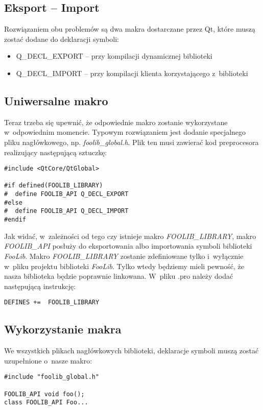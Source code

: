 \subsection{Eksport -- Import}
Rozwiązaniem obu problemów są dwa makra dostarczane przez Qt, które muszą zostać dodane do deklaracji symboli:
\begin{itemize}
\item{Q\_DECL\_EXPORT -- przy kompilacji dynamicznej biblioteki}
\item{Q\_DECL\_IMPORT -- przy kompilacji klienta korzystającego z~biblioteki}
\end{itemize}

\subsection{Uniwersalne makro}
Teraz trzeba się upewnić, że odpowiednie makro zostanie wykorzystane w~odpowiednim momencie. Typowym rozwiązaniem jest dodanie specjalnego pliku nagłówkowego, np. \textit{foolib\_global.h}. Plik ten musi zawierać kod preprocesora realizujący następującą sztuczkę:
\begin{verbatim}
#include <QtCore/QtGlobal>

#if defined(FOOLIB_LIBRARY)
#  define FOOLIB_API Q_DECL_EXPORT
#else
#  define FOOLIB_API Q_DECL_IMPORT
#endif
\end{verbatim}

Jak widać, w~zależności od tego czy istnieje makro \textit{FOOLIB\_LIBRARY}, makro \textit{FOOLIB\_API} posłuży do eksportowania albo importowania symboli biblioteki \textit{FooLib}. Makro \textit{FOOLIB\_LIBRARY} zostanie zdefiniowane tylko i~wyłącznie w~pliku projektu biblioteki \textit{FooLib}. Tylko wtedy będziemy mieli pewność, że nasza biblioteka będzie poprawnie linkowana. W~pliku .pro należy dodać następującą instrukcję:

\begin{verbatim}
DEFINES +=  FOOLIB_LIBRARY
\end{verbatim}

\subsection{Wykorzystanie makra}
We wszystkich plikach nagłówkowych biblioteki, deklaracje symboli muszą zostać uzupełnione o~nasze makro:

\begin{verbatim}
#include "foolib_global.h"

FOOLIB_API void foo();
class FOOLIB_API Foo...
\end{verbatim}

